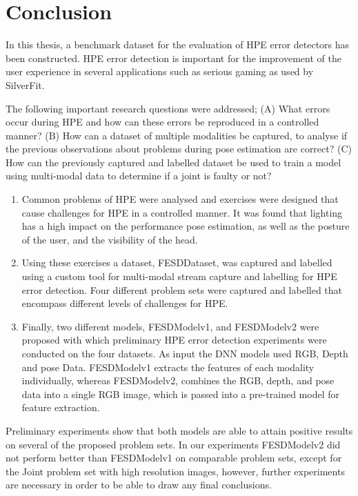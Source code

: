 \chapter{Conclusion}
\label{sec:conclusion}

In this thesis, a benchmark dataset for the evaluation of HPE error detectors has been constructed. HPE error detection is important for the improvement of the user experience in several applications such as serious gaming as used by SilverFit.

The following important research questions were addressed; (A) What errors occur during HPE and how can these errors be reproduced in a controlled manner? (B) How can a dataset of multiple modalities be captured, to analyse if the previous observations about problems during pose estimation are correct? (C) How can the previously captured and labelled dataset be used to train a model using multi-modal data to determine if a joint is faulty or not? 

\begin{enumerate}[label=\Alph*]
  \item Common problems of HPE were analysed and exercises were designed that cause challenges for HPE in a controlled manner. It was found that lighting has a high impact on the performance pose estimation, as well as the posture of the user, and the visibility of the head.
  \item Using these exercises a dataset, FESDDataset, was captured and labelled using a custom tool for multi-modal stream capture and labelling for HPE error detection. Four different problem sets were captured and labelled that encompass different levels of challenges for HPE.
  \item Finally, two different models, FESDModelv1, and FESDModelv2 were proposed with which preliminary HPE error detection experiments were conducted on the four datasets. As input the DNN models used RGB, Depth and pose Data. FESDModelv1 extracts the features of each modality individually, whereas FESDModelv2, combines the RGB, depth, and pose data into a single RGB image, which is passed into a pre-trained model for feature extraction.
\end{enumerate}

Preliminary experiments show that both models are able to attain positive results on several of the proposed problem sets. In our experiments FESDModelv2 did not perform better than FESDModelv1 on comparable problem sets, except for the Joint problem set with high resolution images, however, further experiments are necessary in order to be able to draw any final conclusions.

